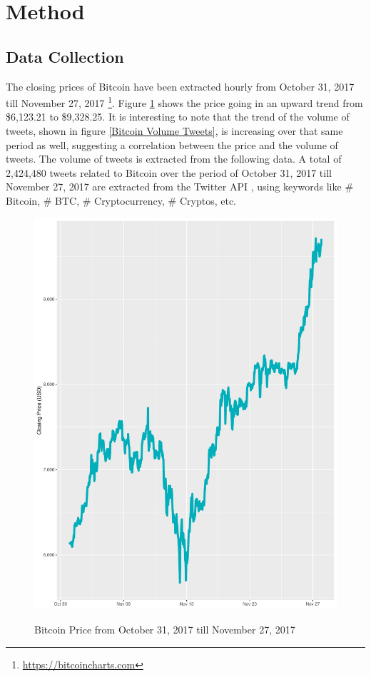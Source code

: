 \documentclass[conference]{IEEEtran}
\begin{document}
\section{Method}

\subsection{Data Collection}
\par The closing prices of Bitcoin have been extracted hourly from October 31, 2017 till November 27, 2017 \footnote{\url{https://bitcoincharts.com}}. Figure \ref{Bitcoin Price} shows the price going in an upward trend from \$6,123.21 to \$9,328.25. It is interesting to note that the trend of the volume of tweets, shown in figure \ref{Bitcoin Volume Tweets}, is increasing over that same period as well, suggesting a correlation between the price and the volume of tweets. The volume of tweets is extracted from the following data. A total of 2,424,480 tweets related to Bitcoin over the period  of October 31, 2017 till November 27, 2017 are extracted from the Twitter API \cite{Twitter API}, using keywords like \# Bitcoin, \# BTC, \# Cryptocurrency, \# Cryptos, etc. 

\begin{minipage}{\linewidth}
\begin{figure}[H]
\centering
\caption{Bitcoin Price from October 31, 2017 till November 27, 2017} 
\includegraphics[scale=0.3]{Graphs/BitcoinPriceChart.pdf}
\label{Bitcoin Price} 
\end{figure}
\end{minipage}
\end{document}
